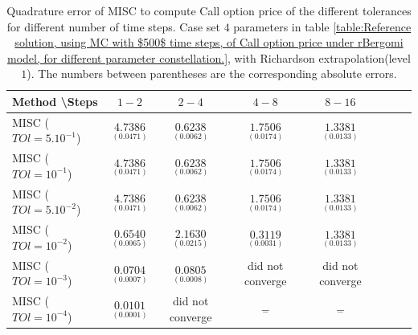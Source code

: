 \documentclass[11pt]{article}
\begin{document}
\begin{table}[h!]
	\centering
	\begin{tabular}{l*{6}{c}r}
		Method \textbackslash  Steps            & $1-2$ & $2-4$ & $4-8$ & $8-16$  \\
		\hline
		MISC ($TOl=5.10^{-1}$)  & $\underset{(0.0471)}{\mathbf{ 4.7386}}$ & $\underset{( 0.0062)}{\mathbf{  0.6238}}$ & $\underset{(  0.0174
			)}{\mathbf{
				1.7506}}$ & $\underset{(  0.0133
			)}{\mathbf{ 
				1.3381
		}}$ \\
		MISC ($TOl=10^{-1}$)  & $\underset{(0.0471)}{\mathbf{ 4.7386}}$ & $\underset{( 0.0062)}{\mathbf{  0.6238}}$ & $\underset{(  0.0174
			)}{\mathbf{
				1.7506}}$ &  $\underset{(  0.0133
			)}{\mathbf{ 
				1.3381
		}}$  \\
		MISC ($TOl=5.10^{-2}$)  & $\underset{(0.0471)}{\mathbf{ 4.7386}}$ & $\underset{( 0.0062)}{\mathbf{  0.6238}}$ & $\underset{(  0.0174
			)}{\mathbf{
				1.7506}}$ &  $\underset{(  0.0133
			)}{\mathbf{ 
				1.3381
		}}$  \\
		MISC ($TOl=10^{-2}$)  & $\underset{( 0.0065) }{\mathbf{    0.6540
		}}$ & $\underset{(0.0215)}{\mathbf{  2.1630}}$ & $\underset{(     0.0031
			
			)}{\mathbf{
				0.3119}}$ &  $\underset{(  0.0133
			)}{\mathbf{ 
				1.3381
		}}$ \\
		MISC ($TOl=10^{-3}$)  & $\underset{(0.0007 ) }{\mathbf{  0.0704  
		}}$ & $\underset{(0.0008)}{\mathbf{0.0805}}$ &did not converge & did not converge  \\
		MISC ($TOl=10^{-4}$)  & $\underset{(0.0001 ) }{\mathbf{   0.0101  
		}}$ & did not converge &$\underset{-}{\mathbf{-}}$ & $\underset{-}{\mathbf{-}}$  \\
		\hline
	\end{tabular}
	\caption{Quadrature error of MISC to compute Call option price of the different tolerances for different number of time steps. Case set $4$ parameters in table \ref{table:Reference solution, using MC with $500$ time steps, of Call option price under rBergomi model, for different parameter constellation.}, with Richardson extrapolation(level $1$). The numbers between parentheses are the corresponding absolute errors.}
	\label{Quadrature error of MISC to compute Call option price of the different tolerances for different number of time steps. Case set $4$ parameters, with Richardson extrapolation(level $1$). The numbers between parentheses are the corresponding absolute errors.}
\end{table}
\end{document}
